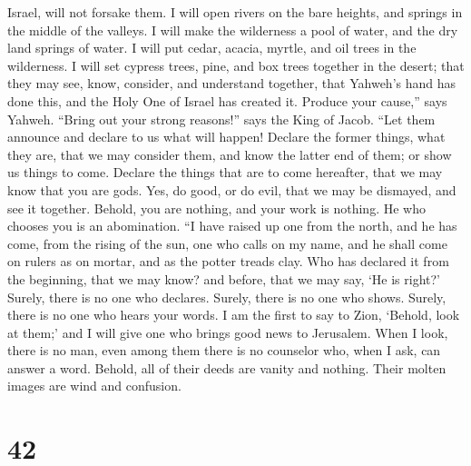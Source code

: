 Israel, will not forsake them.  I will open rivers on the
bare heights, and springs in the middle of the valleys. I will make the
wilderness a pool of water, and the dry land springs of water.
 I will put cedar, acacia, myrtle, and oil trees in the
wilderness. I will set cypress trees, pine, and box trees together in
the desert;  that they may see, know, consider, and
understand together, that Yahweh's hand has done this, and the Holy One
of Israel has created it.  Produce your cause,'' says
Yahweh. ``Bring out your strong reasons!'' says the King of Jacob.
 ``Let them announce and declare to us what will happen!
Declare the former things, what they are, that we may consider them, and
know the latter end of them; or show us things to come. 
Declare the things that are to come hereafter, that we may know that you
are gods. Yes, do good, or do evil, that we may be dismayed, and see it
together.  Behold, you are nothing, and your work is
nothing. He who chooses you is an abomination.  ``I have
raised up one from the north, and he has come, from the rising of the
sun, one who calls on my name, and he shall come on rulers as on mortar,
and as the potter treads clay.  Who has declared it from
the beginning, that we may know? and before, that we may say, `He is
right?' Surely, there is no one who declares. Surely, there is no one
who shows. Surely, there is no one who hears your words. 
I am the first to say to Zion, `Behold, look at them;' and I will give
one who brings good news to Jerusalem.  When I look,
there is no man, even among them there is no counselor who, when I ask,
can answer a word.  Behold, all of their deeds are vanity
and nothing. Their molten images are wind and confusion.

\hypertarget{section-41}{%
\section{42}\label{section-41}}

